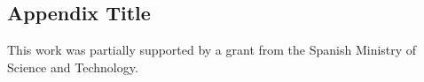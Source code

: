 \documentclass[draft,wrr]{AGUTeX}
\begin{document}
\begin{article}
\appendix

\section{Appendix Title}
 


%
%
%


\begin{acknowledgments}
This work was partially supported by a grant from the Spanish Ministry of Science and Technology.
\end{acknowledgments}






\end{article}
\end{document}
